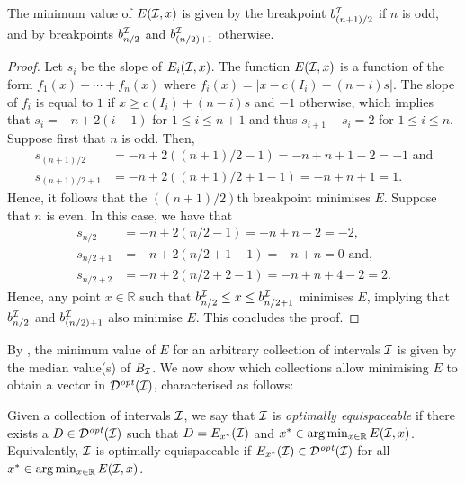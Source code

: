 \begin{mlemmarep}\label{lem:tmd_opt}
     The minimum value of $E(\mathcal{I},x)$ is given by the breakpoint $b^{\mathcal{I}}_{(n+1)/2}$ if $n$ is odd, and by breakpoints $b^{\mathcal{I}}_{n/2}$ and $b^{\mathcal{I}}_{(n/2)+1}$ otherwise.
\end{mlemmarep}
\begin{proof}
    Let $s_i$ be the slope of $E_i(\mathcal{I},x)$.
    The function $E(\mathcal{I},x)$ is a function of the form $f_1(x)+\cdots+f_n(x)$ where $f_i(x) = |x-c(I_i) -(n-i)s|$.
    The slope of $f_i$ is equal to $1$ if $x\ge c(I_i) +(n-i)s$ and $-1$ otherwise, which implies that $s_i = -n + 2(i-1)$ for $1\le i \le n +1$ and thus $s_{i+1}-s_i = 2$ for $1\le i \le n$.
    Suppose first that $n$ is odd.
    Then, 
    \begin{align*}
        s_{(n+1)/2} & = -n + 2((n+1)/2 - 1) = -n +n+1 - 2 = -1\text{ and}\\ 
        s_{(n+1)/2 + 1} &= -n + 2((n+1)/2 + 1 - 1) = -n+n+1 = 1.
    \end{align*}
    Hence, it follows that the $((n+1)/2)$th breakpoint minimises $E$.
    Suppose that $n$ is even.
    In this case, we have that
    \begin{align*}
        s_{n/2} & = -n + 2(n/2 - 1) = -n +n - 2 = -2,\\ 
        s_{n/2 + 1} &= -n + 2(n/2 + 1 - 1) = -n+n = 0\text{ and},\\
        s_{n/2 + 2} &= -n + 2(n/2+2 - 1) = -n + n +4 -2 = 2.
    \end{align*}
    Hence, any point $x\in \mathbb{R}$ such that $b^{\mathcal{I}}_{n/2} \le x \le b^{\mathcal{I}}_{n/2+1}$ minimises $E$, implying that $b^{\mathcal{I}}_{n/2}$ and $b^{\mathcal{I}}_{(n/2)+1}$ also minimise $E$.
    This concludes the proof.
\end{proof}

By , the minimum value of $E$ for an arbitrary collection of intervals $\mathcal{I}$ is given by the median value(s) of $B_{\mathcal{I}}$.
%
%
We now show which collections allow minimising $E$ to obtain a vector in $\mathcal{D}^{\mathit{opt}}(\mathcal{I})$, characterised as follows:
%
\begin{definition}\label{def:equispace_collections}
    Given a collection of intervals $\mathcal{I}$, we say that $\mathcal{I}$ is \emph{optimally equispaceable} if there exists a $D \in \mathcal{D}^{\mathit{opt}}(\mathcal{I})$ such that $D = E_{x^*}(\mathcal{I})$ and $x^* \in \argmin_{x \in \mathbb{R}} E(\I,x)$. Equivalently, $\mathcal{I}$ is optimally equispaceable if $E_{x^*}(\mathcal{I}) \in \mathcal{D}^{\mathit{opt}}(\mathcal{I})$ for all $x^* \in \argmin_{x \in \mathbb{R}} E(\I,x)$.
\end{definition}

